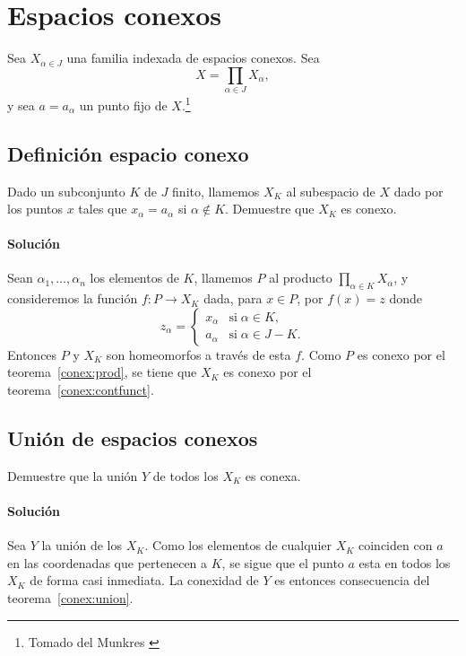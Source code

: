 \documentclass[letterpaper,10pt,final]{article}
\begin{document}
\section{Espacios conexos}\label{sec:conexo}

Sea $X_{\alpha\in J}$ una familia indexada de espacios conexos. Sea
\[
X=\prod_{\alpha\in J} X_\alpha,
\]
y sea $a=a_\alpha$ un punto fijo de $X$.\footnote{Tomado del Munkres \cite[\S23, Nº 10]{munkres_topology_2014}}

\subsection{Definición espacio conexo}

Dado un subconjunto $K$ de $J$ finito, llamemos $X_K$ al subespacio de $X$ dado por los puntos
$x$ tales que $x_\alpha=a_\alpha$ si $\alpha\not\in K$. Demuestre que $X_K$ es conexo.

\paragraph{Solución}
Sean $\alpha_1,\dots,\alpha_n$ los elementos de $K$, llamemos $P$ al producto $\prod_{\alpha\in K}X_\alpha$,
y consideremos la función 
$f:P\to X_K$ dada, para $x\in P$, por $f(x)=z$ donde
\[
z_\alpha= \begin{cases}
	x_\alpha &\text{si}\; \alpha\in K,\\
	a_\alpha &\text{si}\; \alpha\in J-K.
\end{cases}
\]
Entonces $P$ y $X_K$ son homeomorfos a través de esta $f$. Como $P$ es conexo por
el teorema~\ref{conex:prod}, se tiene que $X_K$ es conexo por el teorema~\ref{conex:contfunct}.

\subsection{Unión de espacios conexos}

Demuestre que la unión $Y$ de todos los $X_K$ es conexa.

\paragraph{Solución}
Sea $Y$ la unión de los $X_K$. Como los elementos de cualquier $X_K$ coinciden con
$a$ en las coordenadas que pertenecen a $K$, se sigue que el punto $a$ esta en
todos los $X_K$ de forma casi inmediata. La conexidad de $Y$ es entonces consecuencia del
teorema~\ref{conex:union}.
\end{document}
